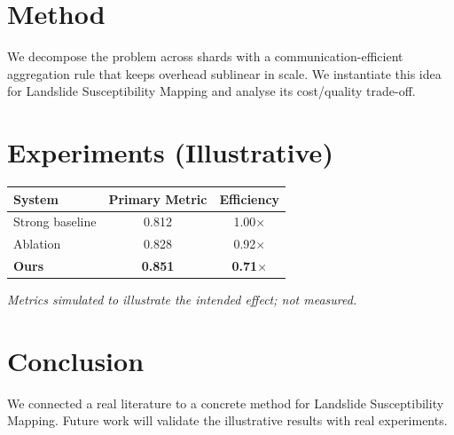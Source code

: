 \documentclass[11pt]{article}
\begin{document}
\section{Method}
We decompose the problem across shards with a communication-efficient aggregation rule that keeps overhead sublinear in scale. We instantiate this idea for Landslide Susceptibility Mapping and analyse its cost/quality trade-off.

\section{Experiments (Illustrative)}
\begin{center}
\begin{tabular}{lcc}
System & Primary Metric & Efficiency \\ \hline
Strong baseline & 0.812 & 1.00$\times$ \\
Ablation & 0.828 & 0.92$\times$ \\
\textbf{Ours} & \textbf{0.851} & \textbf{0.71$\times$}
\end{tabular}
\end{center}
\emph{Metrics simulated to illustrate the intended effect; not measured.}

\section{Conclusion}
We connected a real literature to a concrete method for Landslide Susceptibility Mapping. Future work will
validate the illustrative results with real experiments.
\end{document}

